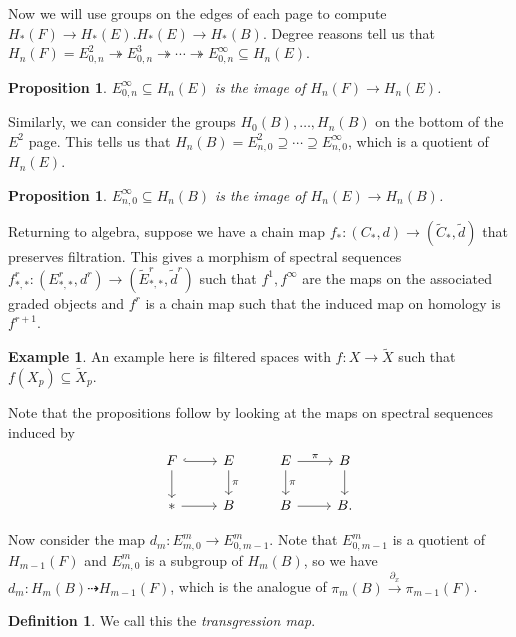 \documentclass[leqno, openany]{memoir}
\newtheorem{prop}[thm]{Proposition}
\theoremstyle{definition}
\newtheorem{defn}[thm]{Definition}
\newtheorem{exm}[thm]{Example}
\theoremstyle{remark}
\theoremstyle{plain}
\theoremstyle{definition}
\theoremstyle{remark}
\newcommand{\wt}[1]{\widetilde{#1}}
\begin{document}
Now we will use groups on the edges of each page to compute $H_*(F) \to H_*(E). H_*(E) \to H_*(B)$.  Degree reasons tell us that $H_n(F) = E_{0,n}^2 \twoheadrightarrow E_{0,n}^3 \twoheadrightarrow \cdots \twoheadrightarrow E_{0,n}^{\infty} \subseteq H_n(E)$.

\begin{prop}
    $E_{0,n}^{\infty} \subseteq H_n(E)$ is the image of $H_n(F) \to H_n(E)$.
\end{prop}

Similarly, we can consider the groups $H_0(B), \ldots, H_n(B)$ on the bottom of the $E^2$ page. This tells us that $H_n(B) = E_{n,0}^2 \supseteq \cdots \supseteq E_{n,0}^{\infty}$, which is a quotient of $H_n(E)$.

\begin{prop}
    $E_{n,0}^{\infty} \subseteq H_n(B)$ is the image of $H_n(E) \to H_n(B)$.
\end{prop}

Returning to algebra, suppose we have a chain map $f_* \colon (C_*, d) \to (\wt{C}_*, \wt{d})$ that preserves filtration. This gives a morphism of spectral sequences $f_{*,*}^r \colon (E_{*,*}^r, d^r) \to (\wt{E}_{*,*}^r, \wt{d}^r)$ such that $f^1, f^{\infty}$ are the maps on the associated graded objects and $f^r$ is a chain map such that the induced map on homology is $f^{r+1}$.

\begin{exm}
    An example here is filtered spaces with $f \colon X \to \wt{X}$ such that $f(X_p) \subseteq \wt{X}_p$.
\end{exm}

Note that the propositions follow by looking at the maps on spectral sequences induced by
\begin{equation*}
\begin{tikzcd}
    F \arrow[hookrightarrow]{r} \arrow{d} & E \arrow{d}{\pi} & E \arrow{r}{\pi} \arrow{d}{\pi} & B \arrow{d} \\
    {*} \arrow{r} & B & B \arrow{r} & B.
\end{tikzcd}
\end{equation*}

Now consider the map $d_m \colon E_{m,0}^m \to E_{0,m-1}^m$. Note that $E_{0,m-1}^m$ is a quotient of $H_{m-1}(F)$ and $E_{m,0}^m$ is a subgroup of $H_m(B)$, so we have $d_m \colon H_m(B) \dashrightarrow H_{m-1}(F)$, which is the analogue of $\pi_m(B) \xrightarrow{\partial_x} \pi_{m-1}(F)$.

\begin{defn}
    We call this the \textit{transgression map}.
\end{defn}
\end{document}

